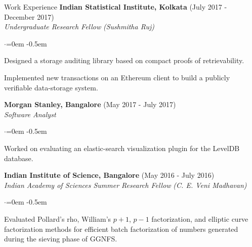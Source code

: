 \documentclass{resume}
\begin{document}
\begin{rSection}{Work Experience}
\textbf{Indian Statistical Institute, Kolkata}  \hfill  (July 2017 - December 2017)\\[0pt]
\emph{Undergraduate Research Fellow}  \hfill  \emph{(Sushmitha Ruj)}
\begin{list}{$\cdot$}{\leftmargin=0em}
\itemsep -0.5em \vspace{-0.5em} %
 \item   Designed a storage auditing library based on compact proofs of retrievability. 
 \item   Implemented new transactions on an Ethereum client to build a publicly verifiable data-storage system.
\end{list}
\vspace{0.5em} %

\textbf{Morgan Stanley, Bangalore}  \hfill  (May 2017 - July 2017)\\[0pt]
\emph{Software Analyst}
\begin{list}{$\cdot$}{\leftmargin=0em}
\itemsep -0.5em \vspace{-0.5em} %
 \item   Worked on evaluating an elastic-search visualization plugin for the LevelDB database.
\end{list}
\vspace{0.5em} %

\textbf{Indian Institute of Science, Bangalore}  \hfill  (May 2016 - July 2016)\\[0pt]
\emph{Indian Academy of Sciences Summer Research Fellow}  \hfill  \emph{(C. E. Veni Madhavan)}
\begin{list}{$\cdot$}{\leftmargin=0em}
\itemsep -0.5em \vspace{-0.5em} %
 \item   Evaluated Pollard's rho, William's \(p+1\), \(p-1\) factorization, and elliptic curve factorization methods for efficient batch factorization of numbers generated during the sieving phase of GGNFS.
\end{list}
\vspace{0.5em} %
\end{rSection}
\end{document}
